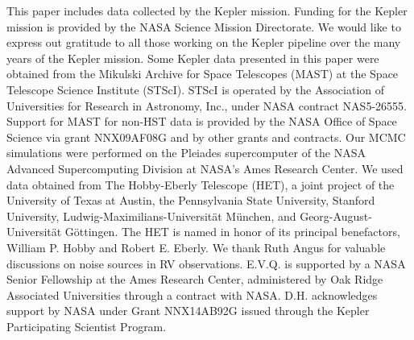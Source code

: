 \documentclass[apjl]{emulateapj}
\begin{document}

\acknowledgments
This paper includes data collected by the Kepler mission. Funding for the Kepler mission is provided by the NASA Science Mission Directorate. We would like to express out gratitude to all those working on the Kepler pipeline over the many years of the Kepler mission. Some Kepler data presented in this paper were obtained from the Mikulski Archive for Space Telescopes (MAST) at the Space Telescope Science Institute (STScI). STScI is operated by the Association of Universities for Research in Astronomy, Inc., under NASA contract NAS5-26555. Support for MAST for non-HST data is provided by the NASA Office of Space Science via grant NNX09AF08G and by other grants and contracts. Our MCMC simulations were performed on the Pleiades supercomputer of the NASA Advanced Supercomputing Division at NASA's Ames Research Center. We used data obtained from The Hobby-Eberly Telescope (HET), a joint project of the University of Texas at Austin, the Pennsylvania State University, Stanford University, Ludwig-Maximilians-Universit\"{a}t M\"{u}nchen, and Georg-August-Universit\"{a}t G\"{o}ttingen. The HET is named in honor of its principal benefactors, William P. Hobby and Robert E. Eberly. We thank Ruth Angus for valuable discussions on noise sources in RV observations. E.V.Q. is supported by a NASA Senior Fellowship at the Ames Research Center, administered by Oak Ridge Associated Universities through a contract with NASA. D.H. acknowledges support by NASA under Grant NNX14AB92G issued through the Kepler Participating Scientist Program.






\end{document}
